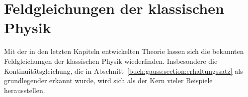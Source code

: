 %
%
%
\chapter{Feldgleichungen der klassischen Physik
\label{chapter:feldgleichungen}}
Mit der in den letzten Kapiteln entwickelten Theorie lassen sich
die bekannten Feldgleichungen der klassischen Physik wiederfinden.
Insbesondere die Kontinuitätsgleichung, die in
Abschnitt~\ref{buch:gauss:section:erhaltungssatz}
als grundlegender erkannt wurde,
wird sich als der Kern vieler Beispiele herausstellen.






